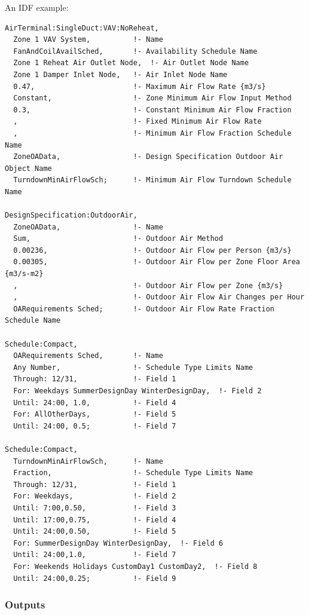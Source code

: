 An IDF example:

\begin{lstlisting}
AirTerminal:SingleDuct:VAV:NoReheat,
  Zone 1 VAV System,          !- Name
  FanAndCoilAvailSched,       !- Availability Schedule Name
  Zone 1 Reheat Air Outlet Node,  !- Air Outlet Node Name
  Zone 1 Damper Inlet Node,   !- Air Inlet Node Name
  0.47,                       !- Maximum Air Flow Rate {m3/s}
  Constant,                   !- Zone Minimum Air Flow Input Method
  0.3,                        !- Constant Minimum Air Flow Fraction
  ,                           !- Fixed Minimum Air Flow Rate
  ,                           !- Minimum Air Flow Fraction Schedule Name
  ZoneOAData,                 !- Design Specification Outdoor Air Object Name
  TurndownMinAirFlowSch;      !- Minimum Air Flow Turndown Schedule Name

DesignSpecification:OutdoorAir,
  ZoneOAData,                 !- Name
  Sum,                        !- Outdoor Air Method
  0.00236,                    !- Outdoor Air Flow per Person {m3/s}
  0.00305,                    !- Outdoor Air Flow per Zone Floor Area {m3/s-m2}
  ,                           !- Outdoor Air Flow per Zone {m3/s}
  ,                           !- Outdoor Air Flow Air Changes per Hour
  OARequirements Sched;       !- Outdoor Air Flow Rate Fraction Schedule Name

Schedule:Compact,
  OARequirements Sched,       !- Name
  Any Number,                 !- Schedule Type Limits Name
  Through: 12/31,             !- Field 1
  For: Weekdays SummerDesignDay WinterDesignDay,  !- Field 2
  Until: 24:00, 1.0,          !- Field 4
  For: AllOtherDays,          !- Field 5
  Until: 24:00, 0.5;          !- Field 7

Schedule:Compact,
  TurndownMinAirFlowSch,      !- Name
  Fraction,                   !- Schedule Type Limits Name
  Through: 12/31,             !- Field 1
  For: Weekdays,              !- Field 2
  Until: 7:00,0.50,           !- Field 3
  Until: 17:00,0.75,          !- Field 4
  Until: 24:00,0.50,          !- Field 5
  For: SummerDesignDay WinterDesignDay,  !- Field 6
  Until: 24:00,1.0,           !- Field 7
  For: Weekends Holidays CustomDay1 CustomDay2,  !- Field 8
  Until: 24:00,0.25;          !- Field 9
\end{lstlisting}

\subsubsection{Outputs}\label{outputs-5}

